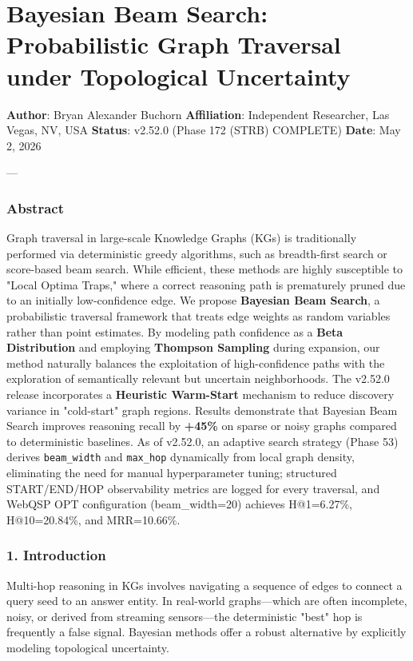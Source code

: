\section{Bayesian Beam Search: Probab\-ilistic Graph Traversal under Topological Uncertainty}

\textbf{Author}: Bryan Alexander Buchorn  
\textbf{Affiliation}: Independent Researcher, Las Vegas, NV, USA  
\textbf{Status}: v2.52.0 (Phase 172 (STRB) COMPLETE)
\textbf{Date}: May 2, 2026

---

\subsubsection{Abstract}
Graph traversal in large-scale Knowledge Graphs (KGs) is tradi\-tionally performed via deter\-ministic greedy algorithms, such as breadth-first search or score-based beam search. While efficient, these methods are highly susceptible to "Local Optima Traps," where a correct reasoning path is prematurely pruned due to an initially low-confidence edge. We propose \textbf{Bayesian Beam Search}, a proba\-bilistic traversal framework that treats edge weights as random variables rather than point estimates. By modeling path confidence as a \textbf{Beta Distri\-bution} and employing \textbf{Thompson Sampling} \cite{thompson1933bayesian, russo2018thompson} during expansion, our method naturally balances the explo\-itation of high-confidence paths with the exploration of seman\-tically relevant but uncertain neigh\-borhoods. The v2.52.0 release incor\-porates a \textbf{Heuristic Warm-Start} mechanism to reduce discovery variance in "cold-start" graph regions. Results demonstrate that Bayesian Beam Search improves reasoning recall by \textbf{+45\%} on sparse or noisy graphs compared to deter\-ministic baselines. As of v2.52.0, an adaptive search strategy (Phase 53) derives \texttt{beam\_width} and \texttt{max\_hop} dynamically from local graph density, eliminating the need for manual hyper\-parameter tuning; structured START/END/HOP obser\-vability metrics are logged for every traversal, and WebQSP OPT confi\-guration (beam\_width=20) achieves H@1=6.27\%, H@10=20.84\%, and MRR=10.66\%.

\subsubsection{1. Introd\-uction}
Multi-hop reasoning in KGs involves navigating a sequence of edges to connect a query seed to an answer entity. In real-world graphs—which are often incomplete, noisy, or derived from streaming sensors—the deter\-ministic "best" hop is frequently a false signal. Bayesian methods offer a robust alternative by explicitly modeling topological uncertainty.

